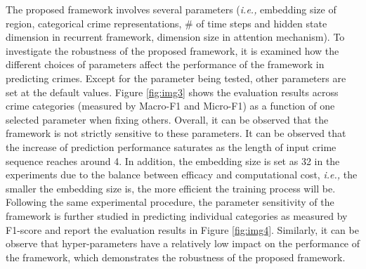 The proposed framework involves several parameters (\emph{i.e.,} 
embedding size of region, categorical crime representations, \# of 
time steps and hidden
state dimension in recurrent framework, dimension size in attention 
mechanism). To investigate the robustness of the proposed
framework, it is examined how the different choices of parameters affect 
the performance of the framework in predicting crimes. Except for
the parameter being tested, other parameters are set at the default
values.
Figure \ref{fig:img3} shows the evaluation results across crime categories
(measured by Macro-F1 and Micro-F1) as a function of one selected
parameter when fixing others. Overall, it can be observed that the framework
is not strictly sensitive to these parameters. It can be observed that the
increase of prediction performance saturates as the length of input
crime sequence reaches around 4. In addition, the embedding
size is set as 32 in the experiments due to the balance between efficacy
and computational cost, \emph{i.e.,} the smaller the embedding size is, the
more efficient the training process will be. Following the same
experimental procedure, the parameter sensitivity of the framework 
is further studied in predicting individual categories as measured by
F1-score and report the evaluation results in Figure \ref{fig:img4}. Similarly, it can be
observe that hyper-parameters have a relatively low impact on
the performance of the framework, which demonstrates the robustness
of the proposed framework.
\newpage
